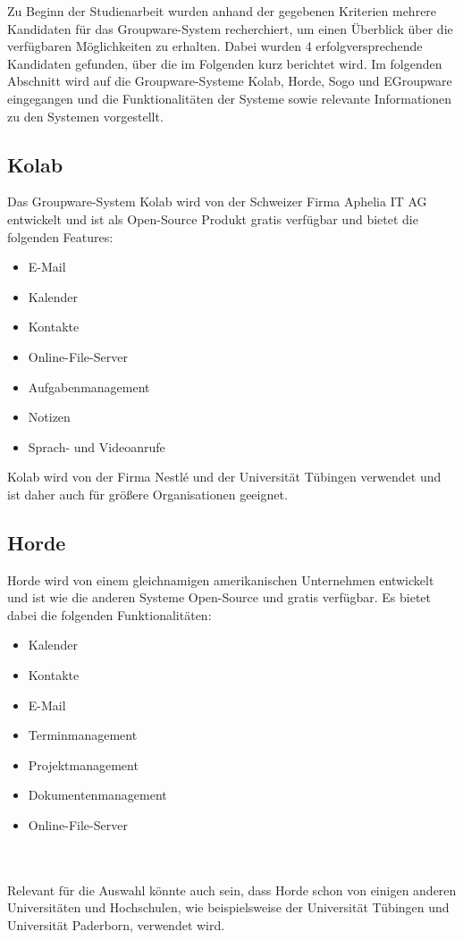 Zu Beginn der Studienarbeit wurden anhand der gegebenen Kriterien mehrere Kandidaten für das Groupware-System recherchiert, um einen Überblick über die verfügbaren Möglichkeiten zu erhalten.
Dabei wurden 4 erfolgversprechende Kandidaten gefunden, über die im Folgenden kurz berichtet wird.
Im folgenden Abschnitt wird auf die Groupware-Systeme Kolab, Horde, Sogo und EGroupware eingegangen und die Funktionalitäten der Systeme sowie relevante Informationen zu den Systemen vorgestellt.


\subsection{Kolab}

Das Groupware-System Kolab wird von der Schweizer Firma Aphelia IT AG entwickelt und ist als Open-Source Produkt gratis verfügbar und bietet die folgenden Features:
\begin{itemize}
    \item E-Mail
    \item Kalender
    \item Kontakte
    \item Online-File-Server
    \item Aufgabenmanagement
    \item Notizen
    \item Sprach- und Videoanrufe
\end{itemize}
\autocite{kolab}

Kolab wird von der Firma Nestlé und der Universität Tübingen verwendet und ist daher auch für größere Organisationen geeignet.

\subsection{Horde}

Horde wird von einem gleichnamigen amerikanischen Unternehmen entwickelt und ist wie die anderen Systeme Open-Source und gratis verfügbar. Es bietet dabei die folgenden Funktionalitäten:
\begin{itemize}
    \item Kalender
    \item Kontakte
    \item E-Mail
    \item Terminmanagement
    \item Projektmanagement
    \item Dokumentenmanagement
    \item Online-File-Server
\end{itemize}
\autocite{horde}
\\
\\
Relevant für die Auswahl könnte auch sein, dass Horde schon von einigen anderen Universitäten und Hochschulen, wie beispielsweise der Universität Tübingen und Universität Paderborn, verwendet wird.

